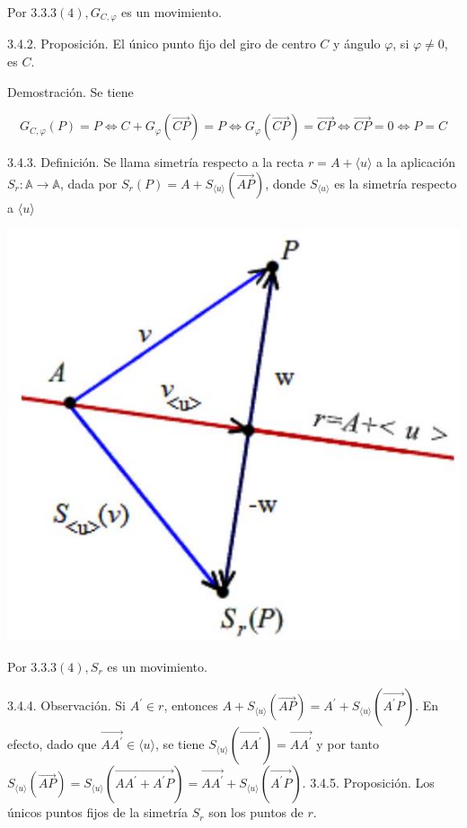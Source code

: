 \documentclass[12pt, a4paper, ones, notitlepage, openany,titlepage]{article}
\begin{document}
Por $3.3 .3(4), G_{C, \varphi}$ es un movimiento.

3.4.2. Proposición. El único punto fijo del giro de centro $C$ y ángulo $\varphi$, si $\varphi \neq 0$, es $C$.

Demostración. Se tiene

$$
G_{C, \varphi}(P)=P \Longleftrightarrow C+G_{\varphi}(\overrightarrow{C P})=P \Longleftrightarrow G_{\varphi}(\overrightarrow{C P})=\overrightarrow{C P} \Longleftrightarrow \overrightarrow{C P}=0 \Longleftrightarrow P=C
$$

3.4.3. Definición. Se llama simetría respecto a la recta $r=A+\langle u\rangle$ a la aplicación $S_{r}: \mathbb{A} \rightarrow \mathbb{A}$, dada por $S_{r}(P)=A+S_{\langle u\rangle}(\overrightarrow{A P})$, donde $S_{\langle u\rangle}$ es la simetría respecto a $\langle u\rangle$

\begin{center}
	\includegraphics[max width=\textwidth]{2023_04_25_301d1803eaf1bc74cfd9g-080}
\end{center}

Por $3.3 .3(4), S_{r}$ es un movimiento.

3.4.4. Observación. Si $A^{\prime} \in r$, entonces $A+S_{\langle u\rangle}(\overrightarrow{A P})=A^{\prime}+S_{\langle u\rangle}\left(\overrightarrow{A^{\prime} P}\right)$. En efecto, dado que $\overrightarrow{A A^{\prime}} \in\langle u\rangle$, se tiene $S_{\langle u\rangle}\left(\overrightarrow{A A^{\prime}}\right)=\overrightarrow{A A^{\prime}}$ y por tanto $S_{\langle u\rangle}(\overrightarrow{A P})=S_{\langle u\rangle}\left(\overrightarrow{A A^{\prime}+A^{\prime} P}\right)=\overrightarrow{A A^{\prime}}+S_{\langle u\rangle}\left(\overrightarrow{A^{\prime} P}\right)$. 3.4.5. Proposición. Los únicos puntos fijos de la simetría $S_{r}$ son los puntos de $r$.
\end{document}
